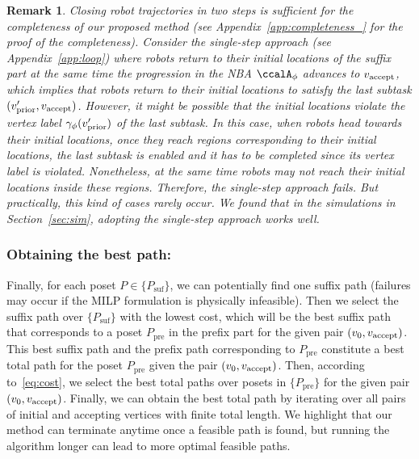 \documentclass[Afour,sageh,times]{sagej}
\newtheorem{rem}[thm]{Remark}
\newcommand{\ltlx}{ {\it LTL}$_{-\bigcirc}^\chi$ }
\newcommand{\autop}{\ccalA_{\phi}}
\newcommand{\vertex}[1]{v_{\textup{#1}}}
\begin{document}
{{ \begin{rem}
   Closing robot trajectories in two steps is sufficient for the completeness of our proposed method (see Appendix~\ref{app:completeness_} for the proof of the completeness). Consider the single-step approach (see Appendix~\ref{app:loop}) where robots return to their initial locations of the suffix part at the same time  the progression in the NBA $\autop$ advances to $\vertex{accept}$, which implies that robots return to their initial locations to satisfy the last subtask $(\vertex{prior}', \vertex{accept})$. However, it might be possible  that the initial locations violate the vertex label $\gamma_\phi(\vertex{prior}')$ of the last subtask. In this case, when robots head towards their initial locations, once they reach regions corresponding to their initial locations, the last subtask is enabled and it has to be completed since its vertex label is violated. Nonetheless, at the same time robots may not reach their initial locations inside these regions. Therefore, the single-step approach fails. But practically, this kind of  cases rarely occur.  We found that in the simulations in Section~\ref{sec:sim}, adopting the single-step approach works well.
 \end{rem}


\subsubsection{Obtaining the best path:}
Finally, for each poset $P \in \{P_{\text{suf}}\}$, we can potentially find one suffix path (failures may occur if the MILP formulation is physically infeasible). Then we select the suffix path over $\{P_{\text{suf}}\}$ with the lowest cost, which will be the best suffix path that corresponds to a poset $P_{\text{pre}}$ in the prefix part for the given pair $(v_0, \vertex{accept})$. This best suffix path and the prefix path corresponding to $P_{\text{pre}}$ constitute a best total path for the poset $P_{\text{pre}}$ given the pair $(v_0, \vertex{accept})$. Then, according to~\eqref{eq:cost}, we select the best total paths over posets in $\{P_{\text{pre}}\}$ for the given pair $(v_0, \vertex{accept})$.  Finally, we can obtain the best total path by iterating over all pairs of initial and accepting vertices with finite total length. We highlight that our method can terminate anytime once a feasible path is found, but running the algorithm longer can lead to more optimal feasible paths.


}}
\end{document}
